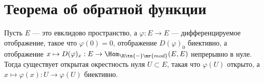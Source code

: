 \documentclass[
	extrafontsizes,
	11pt,
	hyphens,
]{memoir}
\begin{document}
\section{Теорема об обратной функции}



\begin{theorem}
Пусть \(E\) --- это евклидово пространство,
а \(\varphi : E \to E\) --- дифференцируемое отображение, такое что \(\varphi(0) = 0\), отображение \(D(\varphi)_0\) биективно,
а отображение
\(x \mapsto D(\varphi)_x : E \to \Hom_{\R\tn{-}\mr{mod}}(E,E)\) непрерывно в нуле.
Тогда существует открытая окрестность нуля \(U \subset E\), такая что \(\varphi(U)\) открыто, а \(x \mapsto \varphi(x) : U \to \varphi(U)\) биективно.
\end{theorem}
\end{document}

